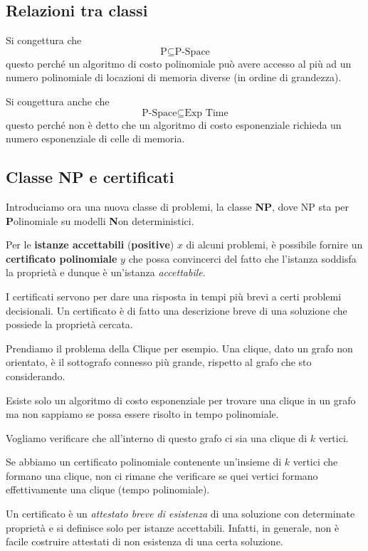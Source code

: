 \subsection{Relazioni tra classi}
Si congettura che
\[ \text{P} \subseteq \text{P-Space} \]
questo perch\'e un algoritmo di costo polinomiale pu\`o avere accesso al pi\`u ad un numero polinomiale di locazioni di
memoria diverse (in ordine di grandezza).

Si congettura anche che
\[ \text{P-Space} \subseteq \text{Exp Time} \]
questo perch\'e non \`e detto che un algoritmo di costo esponenziale richieda un numero esponenziale di celle di memoria.

\subsection{Classe NP e certificati}
Introduciamo ora una nuova classe di problemi, la classe \textbf{NP}, dove NP sta per \textbf{P}olinomiale su modelli
\textbf{N}on deterministici.

Per le \textbf{istanze accettabili} (\textbf{positive}) $x$ di alcuni problemi, \`e possibile fornire un
\textbf{certificato polinomiale} $y$ che possa convincerci del fatto che l'istanza soddisfa la propriet\`a e dunque
\`e un'istanza \emph{accettabile}.

I certificati servono per dare una risposta in tempi pi\`u brevi a certi problemi decisionali. Un certificato \`e di
fatto una descrizione breve di una soluzione che possiede la propriet\`a cercata.

\begin{example}
	Prendiamo il problema della Clique per esempio. Una clique, dato un grafo non orientato, \`e il sottografo
	connesso pi\`u grande, rispetto al grafo che sto considerando.

	Esiste solo un algoritmo di costo esponenziale per trovare una clique in un grafo ma non sappiamo se possa essere
	risolto in tempo polinomiale.

	Vogliamo verificare che all'interno di questo grafo ci sia una clique di $k$ vertici.

	Se abbiamo un certificato polinomiale contenente un'insieme di $k$ vertici che formano una clique, non ci rimane
	che verificare se quei vertici formano effettivamente una clique (tempo polinomiale).
\end{example}

Un certificato \`e un \emph{attestato breve di esistenza} di una soluzione con determinate propriet\`a e si definisce solo
per istanze accettabili. Infatti, in generale, non \`e facile costruire attestati di non esistenza di una certa soluzione.

